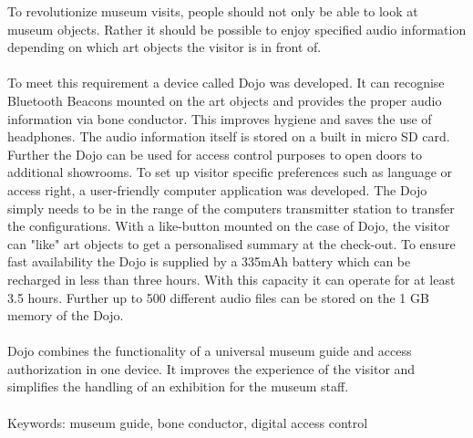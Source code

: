 To revolutionize museum visits, people should not only be able to look at museum objects. Rather it should be possible to enjoy specified audio information depending on which art objects the visitor is in front of.\\\\ To meet this requirement a device called Dojo was developed. It can recognise Bluetooth Beacons mounted on the art objects and provides the proper audio information via bone conductor. This improves hygiene and saves the use of headphones. The audio information itself is stored on a built in micro SD card. Further the Dojo can be used for access control purposes to open doors to additional showrooms. To set up visitor specific preferences such as language or access right, a user-friendly computer application was developed. The Dojo simply needs to be in the range of the computers transmitter station to transfer the configurations. With a like-button mounted on the case of Dojo, the visitor can "like" art objects to get a personalised summary at the check-out. To ensure fast availability the Dojo is supplied by a 335mAh battery which can be recharged in less than three hours. With this capacity it can operate for at least 3.5 hours. Further up to 500 different audio files can be stored on the 1 GB memory of the Dojo.\\\\ Dojo combines the functionality of a universal museum guide and access authorization in one device. It improves the experience of the visitor and simplifies the handling of an exhibition for the museum staff.\\\\Keywords: museum guide, bone conductor, digital access control
